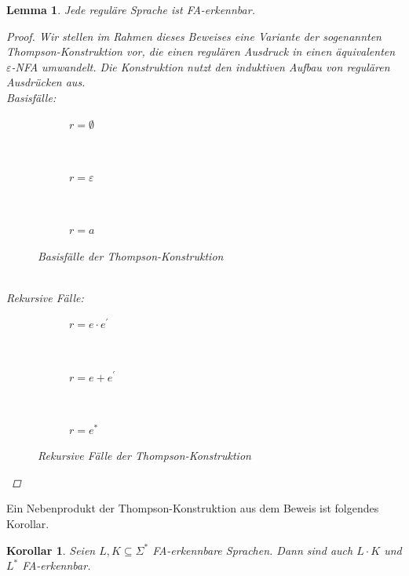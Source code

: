 \documentclass[11pt, a4paper]{article}
\theoremstyle{definition}
\theoremstyle{plain}
\newtheorem{lemma}[definition]{Lemma}
\newtheorem{corollary}[definition]{Korollar}
\numberwithin{equation}{section}
\begin{document}
\begin{lemma}
	Jede reguläre Sprache ist FA-erkennbar.
	\begin{proof}
		Wir stellen im Rahmen dieses Beweises eine Variante der sogenannten Thompson-Konstruktion vor, die einen regulären Ausdruck in einen äquivalenten \( \varepsilon \)-NFA umwandelt. Die Konstruktion nutzt den induktiven Aufbau von regulären Ausdrücken aus.\\
		Basisfälle:
		\begin{figure}[h]
			\centering
			\begin{subfigure}[b]{.25\textwidth}
				\centering
				
				\caption{\( r = \emptyset \)}
				\label{fig:thompson_empty}
			\end{subfigure}~
			\begin{subfigure}[b]{.25\textwidth}
				\centering
				
				\caption{\( r = \varepsilon \)}
				\label{fig:thompson_eps}
			\end{subfigure}~
			\begin{subfigure}[b]{.4\textwidth}
				\centering
				
				\caption{\( r = a \)}
				\label{fig:thompson_symbol}
			\end{subfigure}
			\caption{Basisfälle der Thompson-Konstruktion}
			\label{fig:thompson_basic}
		\end{figure}\\
		Rekursive Fälle:
		\begin{figure}[h]
			\centering
			\begin{subfigure}[b]{.9\textwidth}
				\centering
				
				\caption{\( r = e \cdot e^\prime \)}
				\label{fig:thompson_cat}
			\end{subfigure}\\
			\begin{subfigure}[b]{.9\textwidth}
				\centering
				
				\caption{\( r = e + e^\prime \)}
				\label{fig:thompson_plus}
			\end{subfigure}\\
			\begin{subfigure}[b]{.9\textwidth}
				\centering
				
				\caption{\( r = e^\ast \)}
				\label{fig:thompson_star}
			\end{subfigure}
			\caption{Rekursive Fälle der Thompson-Konstruktion}
			\label{fig:thompson_recursive}
		\end{figure}
	\end{proof}
\end{lemma}
Ein Nebenprodukt der Thompson-Konstruktion aus dem Beweis ist folgendes Korollar.
\begin{corollary}
	Seien \( L, K \subseteq \Sigma^\ast \) FA-erkennbare Sprachen. Dann sind auch \( L \cdot K \) und \( L^\ast \) FA-erkennbar.
\end{corollary}
\end{document}
